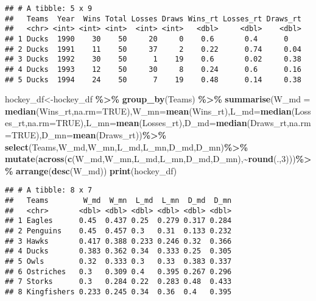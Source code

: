 \documentclass[
]{article}
\newenvironment{Shaded}{\begin{snugshade}}{\end{snugshade}}
\newcommand{\AttributeTok}[1]{\textcolor[rgb]{0.13,0.29,0.53}{#1}}
\newcommand{\ConstantTok}[1]{\textcolor[rgb]{0.56,0.35,0.01}{#1}}
\newcommand{\DecValTok}[1]{\textcolor[rgb]{0.00,0.00,0.81}{#1}}
\newcommand{\FunctionTok}[1]{\textcolor[rgb]{0.13,0.29,0.53}{\textbf{#1}}}
\newcommand{\NormalTok}[1]{#1}
\newcommand{\OtherTok}[1]{\textcolor[rgb]{0.56,0.35,0.01}{#1}}
\newcommand{\SpecialCharTok}[1]{\textcolor[rgb]{0.81,0.36,0.00}{\textbf{#1}}}
\begin{document}
\begin{verbatim}
## # A tibble: 5 x 9
##   Teams  Year  Wins Total Losses Draws Wins_rt Losses_rt Draws_rt
##   <chr> <int> <int> <int>  <int> <int>   <dbl>     <dbl>    <dbl>
## 1 Ducks  1990    30    50     20     0    0.6       0.4      0   
## 2 Ducks  1991    11    50     37     2    0.22      0.74     0.04
## 3 Ducks  1992    30    50      1    19    0.6       0.02     0.38
## 4 Ducks  1993    12    50     30     8    0.24      0.6      0.16
## 5 Ducks  1994    24    50      7    19    0.48      0.14     0.38
\end{verbatim}

\begin{Shaded}
\begin{Highlighting}[]
\NormalTok{hockey\_df}\OtherTok{\textless{}{-}}\NormalTok{hockey\_df }\SpecialCharTok{\%\textgreater{}\%}
  \FunctionTok{group\_by}\NormalTok{(Teams) }\SpecialCharTok{\%\textgreater{}\%}
  \FunctionTok{summarise}\NormalTok{(}\AttributeTok{W\_md =} \FunctionTok{median}\NormalTok{(Wins\_rt,}\AttributeTok{na.rm=}\ConstantTok{TRUE}\NormalTok{),}\AttributeTok{W\_mn=}\FunctionTok{mean}\NormalTok{(Wins\_rt),}\AttributeTok{L\_md=}\FunctionTok{median}\NormalTok{(Losses\_rt,}\AttributeTok{na.rm=}\ConstantTok{TRUE}\NormalTok{),}\AttributeTok{L\_mn=}\FunctionTok{mean}\NormalTok{(Losses\_rt),}\AttributeTok{D\_md=}\FunctionTok{median}\NormalTok{(Draws\_rt,}\AttributeTok{na.rm=}\ConstantTok{TRUE}\NormalTok{),}\AttributeTok{D\_mn=}\FunctionTok{mean}\NormalTok{(Draws\_rt))}\SpecialCharTok{\%\textgreater{}\%}
  \FunctionTok{select}\NormalTok{(Teams,W\_md,W\_mn,L\_md,L\_mn,D\_md,D\_mn)}\SpecialCharTok{\%\textgreater{}\%}
  \FunctionTok{mutate}\NormalTok{(}\FunctionTok{across}\NormalTok{(}\FunctionTok{c}\NormalTok{(W\_md,W\_mn,L\_md,L\_mn,D\_md,D\_mn),}\SpecialCharTok{\textasciitilde{}}\FunctionTok{round}\NormalTok{(.,}\DecValTok{3}\NormalTok{)))}\SpecialCharTok{\%\textgreater{}\%}
  \FunctionTok{arrange}\NormalTok{(}\FunctionTok{desc}\NormalTok{(W\_md))}
\FunctionTok{print}\NormalTok{(hockey\_df)}
\end{Highlighting}
\end{Shaded}

\begin{verbatim}
## # A tibble: 8 x 7
##   Teams        W_md  W_mn  L_md  L_mn  D_md  D_mn
##   <chr>       <dbl> <dbl> <dbl> <dbl> <dbl> <dbl>
## 1 Eagles      0.45  0.437 0.25  0.279 0.317 0.284
## 2 Penguins    0.45  0.457 0.3   0.31  0.133 0.232
## 3 Hawks       0.417 0.388 0.233 0.246 0.32  0.366
## 4 Ducks       0.383 0.362 0.34  0.333 0.25  0.305
## 5 Owls        0.32  0.333 0.3   0.33  0.383 0.337
## 6 Ostriches   0.3   0.309 0.4   0.395 0.267 0.296
## 7 Storks      0.3   0.284 0.22  0.283 0.48  0.433
## 8 Kingfishers 0.233 0.245 0.34  0.36  0.4   0.395
\end{verbatim}
\end{document}
